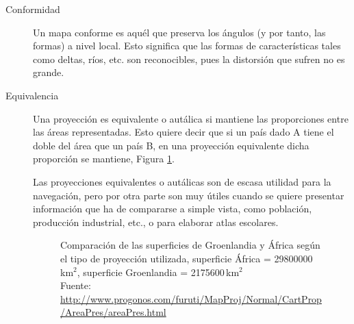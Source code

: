 \begin{description}
\item[Conformidad] Un mapa conforme es aquél que preserva los ángulos (y por tanto, las formas) a nivel local. Esto significa que las formas de características tales como deltas, ríos, etc. son reconocibles, pues la distorsión que sufren no es grande.
\item[Equivalencia] Una proyección es equivalente o autálica si mantiene las proporciones entre las áreas representadas. Esto quiere decir que si un país dado A tiene el doble del área que un país B, en una proyección equivalente dicha proporción se mantiene, Figura \ref{fig:groenlandia.africa.comparacion.superficies.segun.tipo.proyeccion}. 

Las proyecciones equivalentes o autálicas son de escasa utilidad para la navegación, pero por otra parte son muy útiles cuando se quiere presentar información que ha de compararse a simple vista, como población, producción industrial, etc., o para elaborar atlas escolares.


\begin{figure}[!h]
  \centering
  \caption{Comparaci\'on de las superficies de Groenlandia y \'Africa seg\'un el tipo de proyecci\'on utilizada, superficie \'Africa = 29800000\,km$^2$, superficie Groenlandia = 2175600\,km$^2$\\{\footnotesize Fuente: \url{http://www.progonos.com/furuti/MapProj/Normal/CartProp/AreaPres/areaPres.html}}
}
  \label{fig:groenlandia.africa.comparacion.superficies.segun.tipo.proyeccion}
\end{figure}



\end{description}
